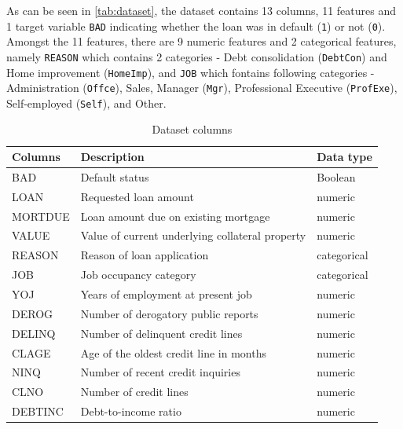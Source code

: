 As can be seen in \autoref{tab:dataset}, the dataset contains 13 columns, 11 features and 1 target variable \texttt{BAD} indicating whether the loan was in default (\texttt{1}) or not (\texttt{0}). 
Amongst the 11 features, there are 9 numeric features and 2 categorical features, namely \texttt{REASON} which contains 2 categories - Debt consolidation (\texttt{DebtCon}) and Home improvement (\texttt{HomeImp}), and \texttt{JOB} which fontains following categories - Administration (\texttt{Offce}), Sales, Manager (\texttt{Mgr}), Professional Executive (\texttt{ProfExe}), Self-employed (\texttt{Self}), and Other.


\begin{table}[H]
    \small
    \setlength{\tabcolsep}{8pt}
    \renewcommand{\arraystretch}{1.3}
    \begin{center}
        \caption[Dataset columns]{Dataset columns}\label{tab:dataset}
    \begin{tabular}{@{} l p{8cm} l @{}}
    \toprule
    \textbf{Columns} & \textbf{Description} & \textbf{Data type}\\
    \midrule
    BAD & Default status & Boolean \\
    \hline
    LOAN & Requested loan amount & numeric \\
    \hline
    MORTDUE & Loan amount due on existing mortgage & numeric \\
    \hline
    VALUE & Value of current underlying collateral property & numeric \\
    \hline
    REASON & Reason of loan application & categorical \\
    \hline
    JOB & Job occupancy category & categorical \\
    \hline
    YOJ & Years of employment at present job & numeric \\
    \hline
    DEROG & Number of derogatory public reports & numeric \\
    \hline
    DELINQ & Number of delinquent credit lines & numeric \\
    \hline
    CLAGE & Age of the oldest credit line in months & numeric \\
    \hline
    NINQ & Number of recent credit inquiries & numeric \\
    \hline
    CLNO & Number of credit lines & numeric \\
    \hline
    DEBTINC & Debt-to-income ratio & numeric \\
    \bottomrule
    \end{tabular}
    \end{center}
    \begin{center} %
    \end{center}
\end{table}

